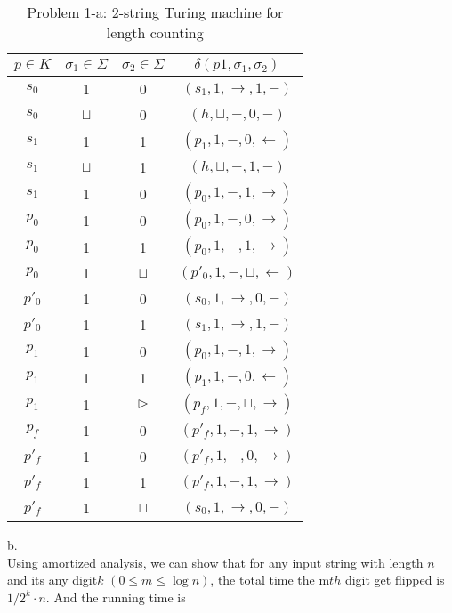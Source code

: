 \documentclass[12pt]{article}
\begin{document}
\begin{table}[ht!]
\begin{center}
\begin{tabular}{|ccc|c|}
  \hline

  $p \in K$ & $\sigma_1 \in \Sigma$ & $\sigma_2 \in \Sigma$
  & $\delta(p1,\sigma_1,\sigma_2)$ \\
  \hline
  $s_0$  &    1     &    0     &  $(s_1, 1, \to, 1, -)$  \\
  $s_0$  & $\sqcup$ &    0     &  $(h, \sqcup, -, 0, -)$  \\
  $s_1$  &    1     &    1     &  $(p_1, 1, -, 0, \gets)$  \\
  $s_1$  & $\sqcup$ &    1     &  $(h, \sqcup, -, 1, -)$  \\
  $s_1$  &    1     &    0     &  $(p_0, 1, -, 1, \to)$  \\
  $p_0$  &    1     &    0     &  $(p_0, 1, -, 0, \to)$ \\
  $p_0$  &    1     &    1     &  $(p_0, 1, -, 1, \to)$ \\
  $p_0$  &    1     & $\sqcup$ &  $(p'_0, 1, -, \sqcup, \gets)$ \\
  $p'_0$ &    1     &    0     &  $(s_0, 1, \to, 0, -)$ \\
  $p'_0$ &    1     &    1     &  $(s_1, 1, \to, 1, -)$ \\
  $p_1$  &    1     &    0     &  $(p_0, 1, -, 1, \to)$ \\
  $p_1$  &    1     &    1     &  $(p_1, 1, -, 0, \gets)$ \\
  $p_1$  &    1     & $\triangleright$ &  $(p_f, 1, -, \sqcup, \to)$ \\
  $p_f$  &    1     &    0     &  $(p'_f, 1, -, 1, \to)$ \\
  $p'_f$ &    1     &    0     &  $(p'_f, 1, -, 0, \to)$ \\
  $p'_f$ &    1     &    1     &  $(p'_f, 1, -, 1, \to)$ \\
  $p'_f$ &    1     & $\sqcup$ &  $(s_0, 1, \to, 0, -)$ \\

  \hline
\end{tabular}
\end{center}
\caption{Problem 1-a: 2-string Turing machine for length
  counting \label{tab:p1_a}}  
\end{table}

b.\\
Using amortized analysis, we can show that for any input string with
length $n$ and its any digit$k$ $(0 \le m \le \log n)$, the total time
the m$th$ digit get flipped is $ 1 / 2^k \cdot n$. And the running
time is
\end{document}

